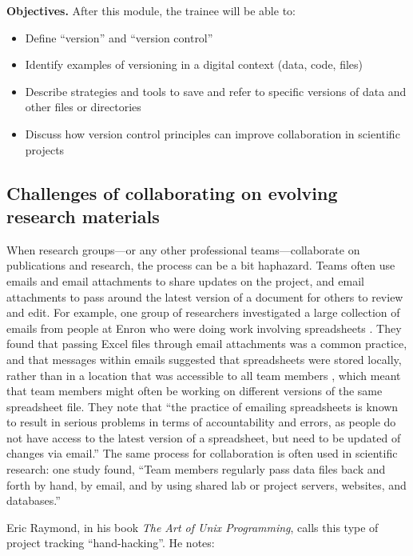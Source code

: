 \documentclass[]{tufte-book}
\providecommand{\tightlist}{%
  \setlength{\itemsep}{0pt}\setlength{\parskip}{0pt}}
\begin{document}
\textbf{Objectives.} After this module, the trainee will be able to:

\begin{itemize}
\tightlist
\item
  Define ``version'' and ``version control''\\
\item
  Identify examples of versioning in a digital context (data, code, files)
\item
  Describe strategies and tools to save and refer to specific versions of data
  and other files or directories
\item
  Discuss how version control principles can improve collaboration in
  scientific projects
\end{itemize}

\subsection{Challenges of collaborating on evolving research materials}\label{challenges-of-collaborating-on-evolving-research-materials}

When research groups---or any other professional teams---collaborate on
publications and research, the process can be a bit haphazard. Teams often use
emails and email attachments to share updates on the project, and email
attachments to pass around the latest version of a document for others to review
and edit. For example, one group of researchers investigated a large collection
of emails from people at Enron who were doing work involving spreadsheets
\citep{hermans2015enron}. They found that passing Excel files through email
attachments was a common practice, and that messages within emails suggested
that spreadsheets were stored locally, rather than in a location that was
accessible to all team members \citep{hermans2015enron}, which meant that team
members might often be working on different versions of the same spreadsheet
file. They note that ``the practice of emailing spreadsheets is known to result
in serious problems in terms of accountability and errors, as people do not have
access to the latest version of a spreadsheet, but need to be updated of changes
via email.'' \citep{hermans2015enron} The same process for collaboration is often used
in scientific research: one study found, ``Team members regularly pass
data files back and forth by hand, by email, and by using shared lab or project
servers, websites, and databases.'' \citep{edwards2011science}

Eric Raymond, in his book \emph{The Art of Unix Programming}, calls this type of
project tracking ``hand-hacking''. He notes:
\end{document}
